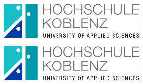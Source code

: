 \thispagestyle{empty} %
{
\selectfont %


\hspace{-0.5cm} %

\begin{figure}
    \begin{subfigure}{0.45\textwidth}
        \centering
        \includegraphics[width=0.8\textwidth]{assets/images/logos/hs_koblenz_logo.png} %
    \end{subfigure}
    \begin{subfigure}{0.45\textwidth}
        \centering
        \includegraphics[width=0.8\textwidth]{assets/images/logos/hs_koblenz_logo.png} %
    \end{subfigure}
\end{figure}

\begin{center}



\end{center}}
